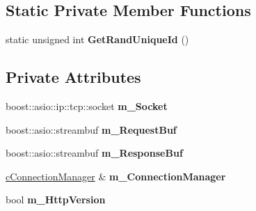 \subsection*{\-Static \-Private \-Member \-Functions}
\begin{DoxyCompactItemize}
\item 
\hypertarget{classhttp__server_1_1cHttpConnection_ae4193c0d2fcd91ee80849f0982b4fe14}{
static unsigned int {\bfseries \-Get\-Rand\-Unique\-Id} ()}
\label{classhttp__server_1_1cHttpConnection_ae4193c0d2fcd91ee80849f0982b4fe14}

\end{DoxyCompactItemize}
\subsection*{\-Private \-Attributes}
\begin{DoxyCompactItemize}
\item 
\hypertarget{classhttp__server_1_1cHttpConnection_acf6b64550b0e0f8287d7b55a5613ef0f}{
boost\-::asio\-::ip\-::tcp\-::socket {\bfseries m\-\_\-\-Socket}}
\label{classhttp__server_1_1cHttpConnection_acf6b64550b0e0f8287d7b55a5613ef0f}

\item 
\hypertarget{classhttp__server_1_1cHttpConnection_a0504245e3903f238ff13145a832d4582}{
boost\-::asio\-::streambuf {\bfseries m\-\_\-\-Request\-Buf}}
\label{classhttp__server_1_1cHttpConnection_a0504245e3903f238ff13145a832d4582}

\item 
\hypertarget{classhttp__server_1_1cHttpConnection_a6f99bd0fa66b31461010ef0948fa428f}{
boost\-::asio\-::streambuf {\bfseries m\-\_\-\-Response\-Buf}}
\label{classhttp__server_1_1cHttpConnection_a6f99bd0fa66b31461010ef0948fa428f}

\item 
\hypertarget{classhttp__server_1_1cHttpConnection_adea2cf9ab3ff28fd70c9a910ef9bfda3}{
\hyperlink{classhttp__server_1_1cConnectionManager}{c\-Connection\-Manager} \& {\bfseries m\-\_\-\-Connection\-Manager}}
\label{classhttp__server_1_1cHttpConnection_adea2cf9ab3ff28fd70c9a910ef9bfda3}

\item 
\hypertarget{classhttp__server_1_1cHttpConnection_a785dff3fa5be6e114762738aae4d031e}{
bool {\bfseries m\-\_\-\-Http\-Version}}
\label{classhttp__server_1_1cHttpConnection_a785dff3fa5be6e114762738aae4d031e}

\end{DoxyCompactItemize}

